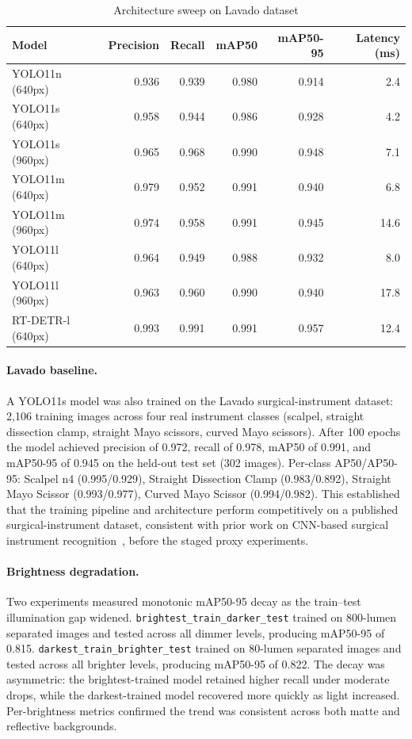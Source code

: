 \documentclass[10pt,a4paper]{article}
\begin{document}
\begin{table}[H]
\centering
\caption{Architecture sweep on Lavado dataset}
\label{tab:architecture-sweep}
\small\renewcommand{\arraystretch}{1.2}\setlength{\tabcolsep}{4pt}
\begin{tabularx}{\textwidth}{lrrrrr}
\hline
Model & Precision & Recall & mAP50 & mAP50-95 & Latency (ms) \\
\hline
YOLO11n (640px) & 0.936 & 0.939 & 0.980 & 0.914 & 2.4 \\
YOLO11s (640px) & 0.958 & 0.944 & 0.986 & 0.928 & 4.2 \\
YOLO11s (960px) & 0.965 & 0.968 & 0.990 & 0.948 & 7.1 \\
YOLO11m (640px) & 0.979 & 0.952 & 0.991 & 0.940 & 6.8 \\
YOLO11m (960px) & 0.974 & 0.958 & 0.991 & 0.945 & 14.6 \\
YOLO11l (640px) & 0.964 & 0.949 & 0.988 & 0.932 & 8.0 \\
YOLO11l (960px) & 0.963 & 0.960 & 0.990 & 0.940 & 17.8 \\
RT-DETR-l (640px) & 0.993 & 0.991 & 0.991 & 0.957 & 12.4 \\
\hline
\end{tabularx}
\end{table}

\paragraph{Lavado baseline.}
A YOLO11s model was also trained on the Lavado surgical-instrument
dataset: 2,106 training images across four real instrument classes
(scalpel, straight dissection clamp, straight Mayo scissors, curved
Mayo scissors). After 100 epochs the model achieved precision of 0.972,
recall of 0.978, mAP50 of 0.991, and mAP50-95 of 0.945 on the held-out
test set (302 images). Per-class AP50/AP50-95: Scalpel n4 (0.995/0.929),
Straight Dissection Clamp (0.983/0.892), Straight Mayo Scissor
(0.993/0.977), Curved Mayo Scissor (0.994/0.982). This established that
the training pipeline and architecture perform competitively on a
published surgical-instrument dataset, consistent with prior work on
CNN-based surgical instrument recognition~\cite{lehr-et-al-2023}, before
the staged proxy experiments.
\paragraph{Brightness degradation.}
Two experiments measured monotonic mAP50-95 decay as the train--test
illumination gap widened. \texttt{brightest\_train\_darker\_test} trained
on 800-lumen separated images and tested across all dimmer levels,
producing mAP50-95 of 0.815. \texttt{darkest\_train\_brighter\_test}
trained on 80-lumen separated images and tested across all brighter
levels, producing mAP50-95 of 0.822. The decay was asymmetric: the
brightest-trained model retained higher recall under moderate drops,
while the darkest-trained model recovered more quickly as light
increased. Per-brightness metrics confirmed the trend was consistent
across both matte and reflective backgrounds.
\end{document}
